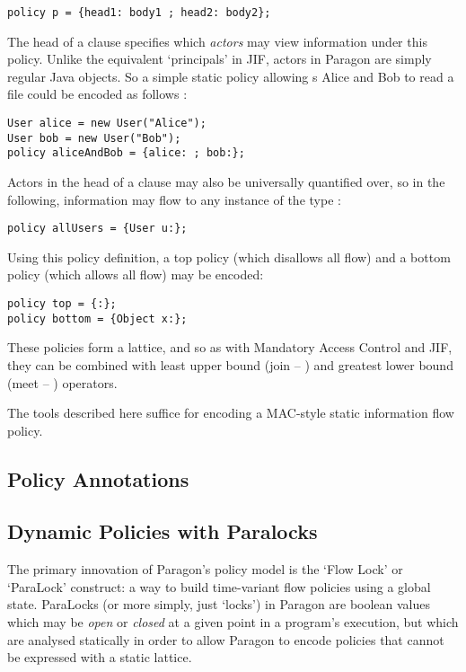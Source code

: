 \begin{verbatim}
policy p = {head1: body1 ; head2: body2};
\end{verbatim}

The head of a clause specifies which \textit{actors} may view information under this policy. Unlike the equivalent `principals' in JIF, actors in Paragon are simply regular Java objects. So a simple static policy allowing s Alice and Bob to read a file could be encoded as follows \cite{broberg2013paragon}:

\begin{verbatim}
User alice = new User("Alice");
User bob = new User("Bob");
policy aliceAndBob = {alice: ; bob:};
\end{verbatim}

Actors in the head of a clause may also be universally quantified over, so in the following, information may flow to any instance of the type :

\begin{verbatim}
policy allUsers = {User u:};
\end{verbatim}

Using this policy definition, a top policy (which disallows all flow) and a bottom policy (which allows all flow) may be encoded:

\begin{verbatim}
policy top = {:};
policy bottom = {Object x:};
\end{verbatim}

These policies form a lattice, and so as with Mandatory Access Control and JIF, they can be combined with least upper bound (join -- \mono{+}) and greatest lower bound (meet -- \mono{*}) operators.

The tools described here suffice for encoding a MAC-style static information flow policy.

\subsection{Policy Annotations}

\subsection{Dynamic Policies with Paralocks}

The primary innovation of Paragon's policy model is the `Flow Lock' or `ParaLock' construct: a way to build time-variant flow policies using a global state. ParaLocks (or more simply, just `locks') in Paragon are boolean values which may be \textit{open} or \textit{closed} at a given point in a program's execution, but which are analysed statically in order to allow Paragon to encode policies that cannot be expressed with a static lattice.

